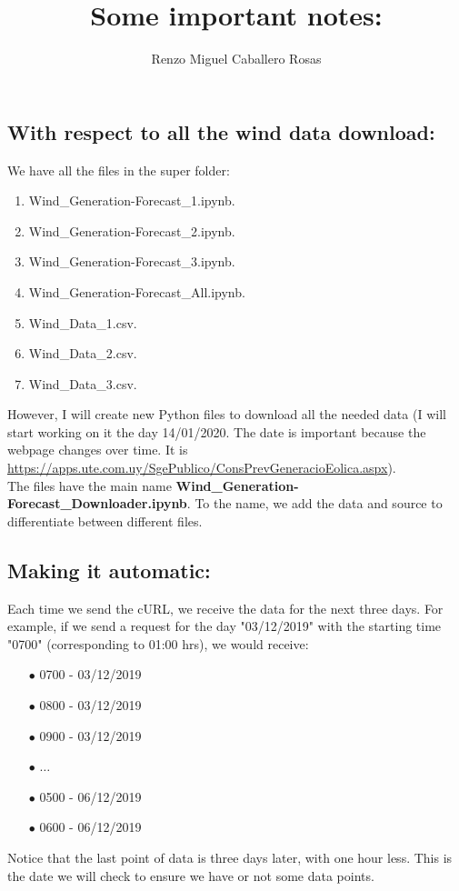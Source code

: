 \documentclass[12pt]{article}
\theoremstyle{definition}
\theoremstyle{remark}
\begin{document}
\title{Some important notes:}
\author{Renzo Miguel Caballero Rosas} 
\maketitle

\subsection*{With respect to all the wind data download:}

We have all the files in the super folder:
\begin{enumerate}

\item Wind\_Generation-Forecast\_1.ipynb.
\item Wind\_Generation-Forecast\_2.ipynb.
\item Wind\_Generation-Forecast\_3.ipynb.
\item Wind\_Generation-Forecast\_All.ipynb.
\item Wind\_Data\_1.csv.
\item Wind\_Data\_2.csv.
\item Wind\_Data\_3.csv.

\end{enumerate}
However, I will create new Python files to download all the needed data (I will start working on it the day 14/01/2020. The date is important because the webpage changes over time. It is \url{https://apps.ute.com.uy/SgePublico/ConsPrevGeneracioEolica.aspx}).\\
The files have the main name \textbf{Wind\_Generation-Forecast\_Downloader.ipynb}. To the name, we add the data and source to differentiate between different files.

\subsection*{Making it automatic:}

Each time we send the cURL, we receive the data for the next three days. For example, if we send a request for the day "03/12/2019" with the starting time "0700" (corresponding to 01:00 hrs), we would receive:
\begin{enumerate}
\item[$\bullet$] 0700 - 03/12/2019
\item[$\bullet$] 0800 - 03/12/2019
\item[$\bullet$] 0900 - 03/12/2019
\item[$\bullet$] $\dots$
\item[$\bullet$] 0500 - 06/12/2019
\item[$\bullet$] 0600 - 06/12/2019
\end{enumerate}
Notice that the last point of data is three days later, with one hour less. This is the date we will check to ensure we have or not some data points.
\end{document}
